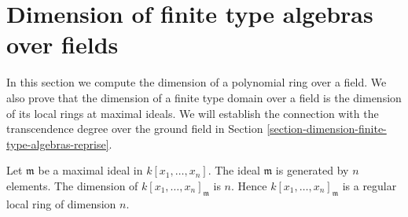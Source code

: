 \section{Dimension of finite type algebras over fields}
\label{section-dimension-finite-type-algebras}

\noindent
In this section we compute the dimension of a polynomial ring over
a field. We also prove that the dimension of a finite type
domain over a field is the dimension of its local rings at maximal
ideals. We will establish the connection with the transcendence
degree over the ground field in
Section \ref{section-dimension-finite-type-algebras-reprise}.

\begin{lemma}
\label{lemma-dim-affine-space}
Let $\mathfrak m$ be a maximal ideal in $k[x_1, \ldots, x_n]$.
The ideal $\mathfrak m$ is generated by $n$ elements.
The dimension of $k[x_1, \ldots, x_n]_{\mathfrak m}$ is $n$.
Hence $k[x_1, \ldots, x_n]_{\mathfrak m}$ is a regular local
ring of dimension $n$.
\end{lemma}

